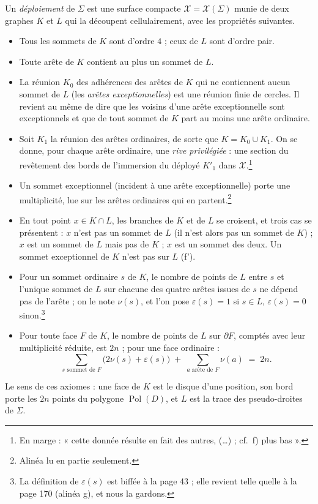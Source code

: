 \documentclass[11pt,a4paper]{article}
\begin{document}
Un \emph{déploiement} de $\Sigma$ est une surface compacte $\mathcal{X} =
\mathcal{X}(\Sigma)$ munie de deux graphes $K$ et $L$ qui la découpent
cellulairement, avec les propriétés suivantes.
\begin{itemize}
\item[a)] Tous les sommets de $K$ sont d'ordre $4$ ; ceux de $L$ sont d'ordre
pair.
\item[b)] Toute arête de $K$ contient au plus un sommet de $L$.
\item[c)] La réunion $K_0$ des adhérences des arêtes de $K$ qui ne contiennent
aucun sommet de $L$ (les \emph{arêtes exceptionnelles}) est une réunion finie
de cercles. Il revient au même de dire que les voisins d'une arête
exceptionnelle sont exceptionnels et que de tout sommet de $K$ part au moins une
arête ordinaire.
\item[d)] Soit $K_1$ la réunion des arêtes ordinaires, de sorte que $K = K_0
\cup K_1$. On se donne, pour chaque arête ordinaire, une \emph{rive
privilégiée} : une section du revêtement des bords de l'immersion du déployé
$K'_1$ dans $\mathcal{X}$.\footnote{En marge : « cette donnée résulte en fait
des autres, (\ldots) ; cf.\ f) plus bas ».}
\item[e)] Un sommet exceptionnel (incident à une arête exceptionnelle) porte
une multiplicité, lue sur les arêtes ordinaires qui en partent.\footnote{Alinéa
lu en partie seulement.}
\item[f)] En tout point $x \in K \cap L$, les branches de $K$ et de $L$ se
croisent, et trois cas se présentent : $x$ n'est pas un sommet de $L$ (il n'est
alors pas un sommet de $K$) ; $x$ est un sommet de $L$ mais pas de $K$ ; $x$ est
un sommet des deux. Un sommet exceptionnel de $K$ n'est pas sur $L$ (f').
\item[g)] Pour un sommet ordinaire $s$ de $K$, le nombre de points de $L$ entre
$s$ et l'unique sommet de $L$ sur chacune des quatre arêtes issues de $s$ ne
dépend pas de l'arête ; on le note $\nu(s)$, et l'on pose $\varepsilon(s) = 1$
si $s \in L$, $\varepsilon(s) = 0$ sinon.\footnote{La définition de
$\varepsilon(s)$ est biffée à la page 43 ; elle revient telle quelle à la page
170 (alinéa g), et nous la gardons.}
\item[h)] Pour toute face $F$ de $K$, le nombre de points de $L$ sur $\partial F$,
comptés avec leur multiplicité réduite, est $2n$ ; pour une face ordinaire :
\[
\sum_{s \text{ sommet de } F} \bigl( 2\nu(s) + \varepsilon(s) \bigr) \;+\;
\sum_{a \text{ arête de } F} \nu(a) \;=\; 2n .
\]
\end{itemize}
Le sens de ces axiomes : une face de $K$ est le disque d'une position, son bord
porte les $2n$ points du polygone $\operatorname{Pol}(D)$, et $L$ est la trace
des pseudo-droites de $\Sigma$.
\end{document}

